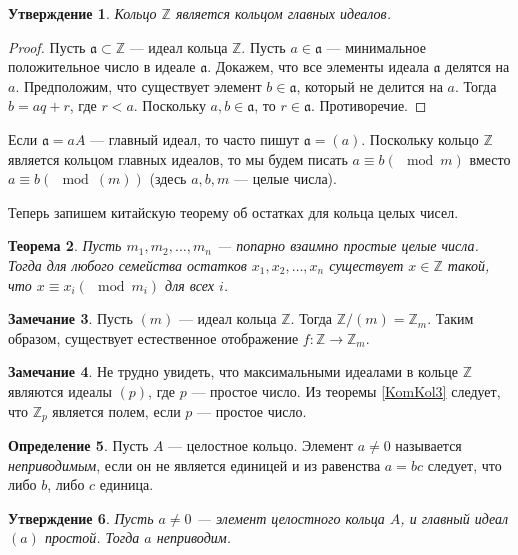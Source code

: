\documentclass[12pt, titlepage, oneside]{amsbook}
\newcommand{\ZZ}{\mathbb{Z}}
\newcommand{\aaa}{\mathfrak{a}}
\newtheorem{theorem}{Теорема}[chapter]
\newtheorem{claim}[theorem]{Утверждение}
\theoremstyle{definition}
\newtheorem{definition}[theorem]{Определение}
\newtheorem{remark}[theorem]{Замечание}
\theoremstyle{remark}
\begin{document}
\begin{claim}
	\label{KomKol5} Кольцо $\ZZ$ является кольцом главных идеалов.
\end{claim}

\begin{proof}
	Пусть $\aaa\subset\ZZ$ --- идеал кольца $\ZZ$. Пусть $a\in\aaa$ --- минимальное положительное число в идеале $\aaa$. Докажем, что все элементы идеала $\aaa$ делятся на $a$. Предположим, что существует элемент $b\in\aaa$, который не делится на $a$. Тогда $b=aq+r$, где $r<a$. Поскольку $a,b\in\aaa$, то $r\in\aaa$. Противоречие.
\end{proof}

Если $\aaa=aA$ --- главный идеал, то часто пишут $\aaa=(a)$. Поскольку кольцо $\ZZ$ является кольцом главных идеалов, то мы будем писать $a\equiv b (\mod m)$ вместо $a\equiv b (\mod (m))$ (здесь $a,b,m$ --- целые числа).

Теперь запишем китайскую теорему об остатках для кольца целых чисел.

\begin{theorem}
	\label{KitOst3} Пусть $m_1,m_2,\ldots,m_n$ --- попарно взаимно простые целые числа. Тогда для любого семейства остатков $x_1,x_2,\ldots, x_n$ существует $x\in \ZZ$ такой, что $x\equiv x_i (\mod m_i)$ для всех $i$.
\end{theorem}

\begin{remark}
	Пусть $(m)$ --- идеал кольца $\ZZ$. Тогда $\ZZ/(m)=\ZZ_m$. Таким образом, существует естественное отображение $f\colon\ZZ\rightarrow\ZZ_m$.
\end{remark}

\begin{remark}
	Не трудно увидеть, что максимальными идеалами в кольце $\ZZ$ являются идеалы $(p)$, где $p$ --- простое число.
	Из теоремы \ref{KomKol3} следует, что $\ZZ_p$ является полем, если $p$ --- простое число.
\end{remark}

\begin{definition}
	Пусть $A$ --- целостное кольцо. Элемент $a\neq 0$ называется \emph{неприводимым}, если он не является единицей и из равенства $a=bc$ следует, что либо $b$, либо $c$ единица.
\end{definition}

\begin{claim}
	\label{Gl1} Пусть $a\neq 0$ --- элемент целостного кольца $A$, и главный идеал $(a)$ простой. Тогда $a$ неприводим.
\end{claim}
\end{document}
